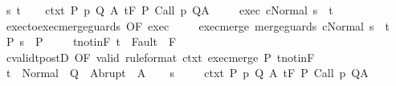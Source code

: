 \begin{isabellebody}
\ s\ t\isanewline
\ \ \isamarkupfalse%
\ ctxt{\isacharcolon}\ {\isachardoublequoteopen}{\isasymforall}{\isacharparenleft}P{\isacharcomma}\ p{\isacharcomma}\ Q{\isacharcomma}\ A{\isacharparenright}{\isasymin}{\isasymTheta}{\isachardot}\ {\isasymGamma}{\isasymTurnstile}\isactrlsub t\isactrlbsub {\isacharslash}F\isactrlesub \ P\ {\isacharparenleft}Call\ p{\isacharparenright}\ Q{\isacharcomma}A{\isachardoublequoteclose}\ \isanewline
\ \ \isamarkupfalse%
\ exec{\isacharcolon}\ {\isachardoublequoteopen}{\isasymGamma}{\isasymturnstile}{\isasymlangle}c{\isacharcomma}Normal\ s{\isasymrangle}\ {\isasymRightarrow}\ t{\isachardoublequoteclose}\ \isanewline
\ \ \isamarkupfalse%
\ exec{\isacharunderscore}to{\isacharunderscore}exec{\isacharunderscore}merge{\isacharunderscore}guards\ {\isacharbrackleft}OF\ exec{\isacharbrackright}\ \isanewline
\ \ \isamarkupfalse%
\ exec{\isacharunderscore}merge{\isacharcolon}\ {\isachardoublequoteopen}{\isasymGamma}{\isasymturnstile}{\isasymlangle}merge{\isacharunderscore}guards\ c{\isacharcomma}Normal\ s{\isasymrangle}\ {\isasymRightarrow}\ t{\isachardoublequoteclose}\isacommand{{\isachardot}}\isamarkupfalse%
\isanewline
\ \ \isamarkupfalse%
\ P{\isacharcolon}\ {\isachardoublequoteopen}s\ {\isasymin}\ P{\isachardoublequoteclose}\ \isanewline
\ \ \isamarkupfalse%
\ t{\isacharunderscore}notin{\isacharunderscore}F{\isacharcolon}\ {\isachardoublequoteopen}t\ {\isasymnotin}\ Fault\ {\isacharbackquote}\ F{\isachardoublequoteclose}\isanewline
\ \ \isamarkupfalse%
\ cvalidt{\isacharunderscore}postD\ {\isacharbrackleft}OF\ valid\ {\isacharbrackleft}rule{\isacharunderscore}format{\isacharbrackright}\ ctxt\ exec{\isacharunderscore}merge\ P\ t{\isacharunderscore}notin{\isacharunderscore}F{\isacharbrackright}\isanewline
\ \ \isamarkupfalse%
\ {\isachardoublequoteopen}t\ {\isasymin}\ Normal\ {\isacharbackquote}\ Q\ {\isasymunion}\ Abrupt\ {\isacharbackquote}\ A{\isachardoublequoteclose}\isacommand{{\isachardot}}\isamarkupfalse%
\isanewline
{}\isamarkupfalse%
\isanewline
\ \ \isamarkupfalse%
\ s\ \isanewline
\ \ \isamarkupfalse%
\ ctxt{\isacharcolon}\ {\isachardoublequoteopen}{\isasymforall}{\isacharparenleft}P{\isacharcomma}\ p{\isacharcomma}\ Q{\isacharcomma}\ A{\isacharparenright}{\isasymin}{\isasymTheta}{\isachardot}\ {\isasymGamma}{\isasymTurnstile}\isactrlsub t\isactrlbsub {\isacharslash}F\isactrlesub \ P\ {\isacharparenleft}Call\ p{\isacharparenright}\ Q{\isacharcomma}A{\isachardoublequoteclose}\ \isanewline

\end{isabellebody}
